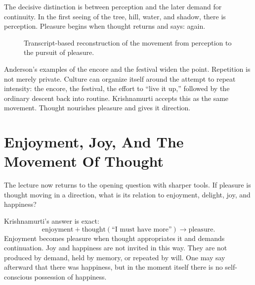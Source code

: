 The decisive distinction is between perception and the later demand for continuity. In the first seeing of the tree, hill, water, and shadow, there is perception. Pleasure begins when thought returns and says: again.

\begin{figure}
\centering
{}

Transcript-based reconstruction of the movement from perception to the pursuit of pleasure.
\end{figure}

Anderson's examples of the encore and the festival widen the point. Repetition is not merely private. Culture can organize itself around the attempt to repeat intensity: the encore, the festival, the effort to ``live it up,'' followed by the ordinary descent back into routine. Krishnamurti accepts this as the same movement. Thought nourishes pleasure and gives it direction.

\section{Enjoyment, Joy, And The Movement Of Thought}

The lecture now returns to the opening question with sharper tools. If pleasure is thought moving in a direction, what is its relation to enjoyment, delight, joy, and happiness?

Krishnamurti's answer is exact:
\begin{equation}
\text{enjoyment}
+
\text{thought}(\text{``I must have more''})
\longrightarrow
\text{pleasure}.
\end{equation}
Enjoyment becomes pleasure when thought appropriates it and demands continuation. Joy and happiness are not invited in this way. They are not produced by demand, held by memory, or repeated by will. One may say afterward that there was happiness, but in the moment itself there is no self-conscious possession of happiness.

